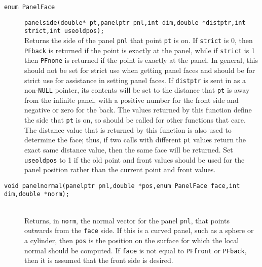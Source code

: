 \documentclass {book}
\newcommand {\ttt} {\texttt}
\begin{document}
\begin{description}
\item[\ttt{enum PanelFace}]
\ttt{panelside(double* pt,panelptr pnl,int dim,double *distptr,int strict,int useoldpos);}
\hfill \\
Returns the side of the panel \ttt{pnl} that point \ttt{pt} is on. If \ttt{strict} is 0, then \ttt{PFback} is returned if the point is exactly at the panel, while if \ttt{strict} is 1 then \ttt{PFnone} is returned if the point is exactly at the panel. In general, this should not be set for strict use when getting panel faces and should be for strict use for assistance in setting panel faces. If \ttt{distptr} is sent in as a non-\ttt{NULL} pointer, its contents will be set to the distance that \ttt{pt} is away from the infinite panel, with a positive number for the front side and negative or zero for the back. The values returned by this function define the side that \ttt{pt} is on, so should be called for other functions that care. The distance value that is returned by this function is also used to determine the face; thus, if two calls with different \ttt{pt} values return the exact same distance value, then the same face will be returned. Set \ttt{useoldpos} to 1 if the old point and front values should be used for the panel position rather than the current point and front values.

\item[\ttt{void panelnormal(panelptr pnl,double *pos,enum PanelFace face,int dim,double *norm);}]
\hfill \\
Returns, in \ttt{norm}, the normal vector for the panel \ttt{pnl}, that points outwards from the \ttt{face} side. If this is a curved panel, such as a sphere or a cylinder, then \ttt{pos} is the position on the surface for which the local normal should be computed. If \ttt{face} is not equal to \ttt{PFfront} or \ttt{PFback}, then it is assumed that the front side is desired.


\end{description}
\end{document}

